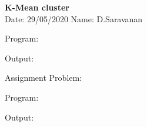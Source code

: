 \documentclass[a4paper,11pt,openright]{report}
\begin{document}
\singlespacing
\pagestyle{plain}

\begin{center}
\textbf{K-Mean cluster} \\
Date: 29/05/2020 \hspace{2mm} Name: D.Saravanan
\end{center}

\vspace{10px}

Program:


\pagebreak

Output:


\pagebreak

Assignment Problem:

Program:


\pagebreak

Output:

\end{document}
